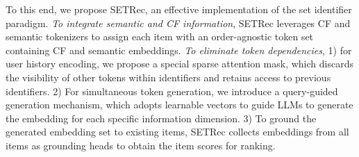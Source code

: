 To this end, we propose SETRec, an effective implementation of the set identifier paradigm. 
\textit{To integrate semantic and CF information}, SETRec leverages CF and semantic tokenizers to assign each item with an order-agnostic token set containing CF and semantic embeddings. 
\textit{To eliminate token dependencies}, 
1) for user history encoding, 
we propose a special sparse attention mask, which discards the visibility of other tokens within identifiers and retains access to previous identifiers. 
2) For simultaneous token generation, 
we introduce a query-guided generation mechanism, which adopts learnable vectors to guide LLMs to generate the embedding for each specific information dimension. 
3) To ground the generated embedding set to existing items, SETRec collects embeddings from all items as grounding heads to obtain the item scores for ranking. 
